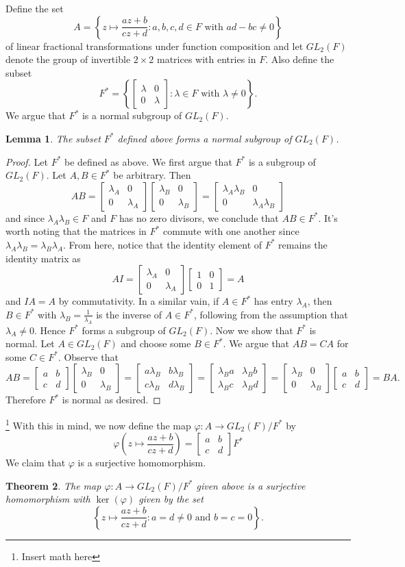 \documentclass[12pt]{article}
\newcommand{\lftmat}[4]{\begin{bmatrix} {#1} & {#2} \\ {#3} & {#4} \end{bmatrix}}
\newcommand{\stanlftmat}{\lftmat{a}{b}{c}{d}}
\theoremstyle{plain}
\newtheorem{theorem}{Theorem}[section]
\newtheorem{lemma}[theorem]{Lemma}
\theoremstyle{definition}
\begin{document}
\begin{appendices}
\noindent Define the set
	\[
		A = \left\lbrace z\mapsto \frac{az + b}{cz + d}\colon a,b,c,d\in F\text{ with } ad - bc \neq 0\right\rbrace
	\]
of linear fractional transformations under function composition and let $GL_2(F)$ denote the group of invertible $2\times 2$ matrices with entries in $F$. Also define the subset
	\[
		F^* = \left\lbrace\lftmat{\lambda}{0}{0}{\lambda}\colon \lambda\in F\text{ with } \lambda\neq 0 \right\rbrace.
	\]
	We argue that $F^*$ is a normal subgroup of $GL_2(F)$.
\begin{lemma}
	The subset $F^*$ defined above forms a normal subgroup of $GL_2(F)$.
\end{lemma}
\begin{proof}
	Let $F^*$ be defined as above. We first argue that $F^*$ is a subgroup of $GL_2(F)$. Let $A,B\in F^*$ be arbitrary. Then
	\[
		AB = \lftmat{\lambda_A}{0}{0}{\lambda_A}\lftmat{\lambda_B}{0}{0}{\lambda_B} = \lftmat{\lambda_A\lambda_B}{0}{0}{\lambda_A\lambda_B}
	\]
	and since $\lambda_A\lambda_B\in F$ and $F$ has no zero divisors, we conclude that $AB\in F^*$. It's worth noting that the matrices in $F^*$ commute with one another since $\lambda_A\lambda_B = \lambda_B\lambda_A$. From here, notice that the identity element of $F^*$ remains the identity matrix as
	\[
		AI = \lftmat{\lambda_A}{0}{0}{\lambda_A}\lftmat{1}{0}{0}{1} = A
	\]
	and $IA = A$ by commutativity. In a similar vain, if $A\in F^*$ has entry $\lambda_A$, then $B\in F^*$ with $\lambda_B = \frac{1}{\lambda_A}$ is the inverse of $A\in F^*$, following from the assumption that $\lambda_A \neq 0$. Hence $F^*$ forms a subgroup of $GL_2(F)$. Now we show that $F^*$ is normal. Let $A\in GL_2(F)$ and choose some $B\in F^*$. We argue that $AB = CA$ for some $C\in F^*$. Observe that
	\[
		AB = \stanlftmat\lftmat{\lambda_B}{0}{0}{\lambda_B} = \lftmat{a\lambda_B}{b\lambda_B}{c\lambda_B}{d\lambda_B} = \lftmat{\lambda_B a}{\lambda_B b}{\lambda_B c}{\lambda_B d} = \lftmat{\lambda_B}{0}{0}{\lambda_B}\stanlftmat = BA.
	\]
	Therefore $F^*$ is normal as desired.
\end{proof}
	
	\footnote{Insert math here} With this in mind, we now define the map $\varphi\colon A\rightarrow GL_2(F)/F^*$ by
	\[
		\varphi\left(z\mapsto \frac{az + b}{cz + d}\right) = \stanlftmat F^*
	\]
	We claim that $\varphi$ is a surjective homomorphism.
\begin{theorem}
		The map $\varphi\colon A\rightarrow GL_2(F)/F^*$ given above is a surjective homomorphism with $\ker(\varphi)$ given by the set
		\[
			\left\lbrace z\mapsto \frac{az + b}{cz + d}\colon a = d\neq 0\text{ and } b = c = 0\right\rbrace.
		\]
\end{theorem}


\end{appendices}
\end{document}
